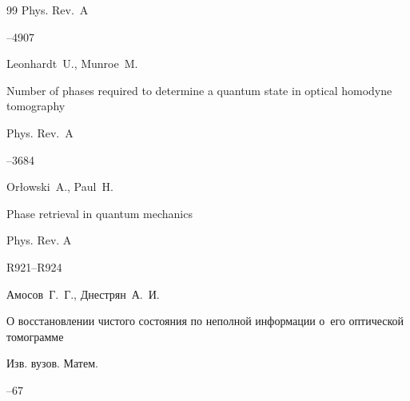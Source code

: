 \begin{thebibliography}{99}
 \jour Phys. Rev.~A




--4907





\by  Leonhardt~U., Munroe~M.

\paper Number of phases required to determine a quantum state in optical homodyne tomography

 \jour  Phys. Rev.~A




--3684







\by Or{\l}owski~A.,  Paul~H.

\paper Phase retrieval in quantum mechanics

\jour Phys. Rev. A




\pages R921--R924











\by Амосов~Г.~Г., Днестрян~А.~И.

\paper О восстановлении чистого состояния по неполной информации о~его оптической томограмме

\jour Изв. вузов. Матем.



--67




\end{thebibliography}



\RuDate





